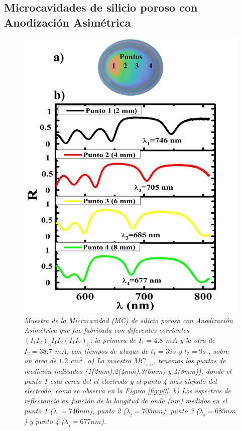 \documentclass[a4paper,11pt,]{book}
\begin{document}
\subsection{Microcavidades de silicio poroso con Anodización Asimétrica}
\begin{figure}[H]
	\centering
	\includegraphics[scale=.25]{../Images/PsiR1}
	\caption{\emph{Muestra de la Microcavidad (MC) de silicio poroso con Anodización Asimétrica que fue fabricada con diferentes  corrientes $(I_1I_2)_5I_1I_2(I_1I_2)_5$, la primera de $I_1=4.8 \ \  mA$ y la otra de  $I_2=38.7 \ \  mA$, con tiempos de ataque de $t_1=39s$ y $t_2=9s$ , sobre un área de $1.2 \ \ cm^2$. a) La muestra $MC_{_{21^{\circ} C}}$, tenemos los puntos de medición indicados (1(2mm),2(4mm),3(6mm) y 4(8mm)), donde el punto 1 esta  cerca del el electrodo y el punto 4 mas alejado del electrodo, como se  observa en la Figura \ref{fig:p0}. b) Los espectros de reflectancia  en función de la longitud de onda (nm) medidos en el punto 1 ($\lambda_{_{1}}=746 nm$), punto 2 ($\lambda_{_{2}}=705 nm$), punto 3 ($\lambda_{_{3}}=685 nm$) y punto 4 ($\lambda_{_{4}}=677 nm$). }}
	\label{fig:p1}
\end{figure}
\end{document}
